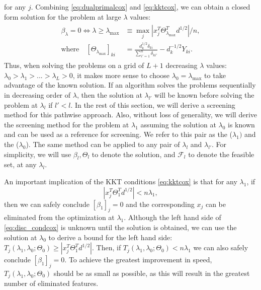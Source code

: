 for any $j$. Combining \eqref{eq:dualprimalcox} and \eqref{eq:kktcox}, we can obtain a closed form solution for the problem at large $\lambda$ values:
\begin{gather}
    \label{eq:lammaxcox}
    \begin{aligned}
        \beta_\lambda=0\iff \lambda \geq \lambda_{\max}&\equiv \max_j \left|x_j^T\Theta^T_{\lambda_{\max}}d^{1/2}\right|/n,\\
        \textrm{where}\quad[\Theta_{\lambda_{\max}}]_{ki}&=\frac{d_k^{1/2}\delta_{ki}}{\sum_{i'=1}^n\delta_{ki'}}-d_k^{-1/2}Y_{ki}.
    \end{aligned}
\end{gather}
Thus, when solving the problems on a grid of $L+1$ decreasing $\lambda$ values: $\lambda_0>\lambda_1>...>\lambda_L>0$, it makes more sense to choose $\lambda_0=\lambda_{\max}$ to take advantage of the known solution. If an algorithm solves the problems sequentially in decreasing order of $\lambda$, then the solution at $\lambda_{l'}$ will be known before solving the problem at $\lambda_l$ if $l'<l$. In the rest of this section, we will derive a screening method for this pathwise approach. Also, without loss of generality, we will derive the screening method for the problem at $\lambda_1$ assuming the solution at $\lambda_0$ is known and can be used as a reference for screening. We refer to this pair as the  ($\lambda_1)$ and the  ($\lambda_0$). The same method can be applied to any pair of $\lambda_{l}$ and $\lambda_{l'}$. For simplicity, we will use $\beta_l,\Theta_l$ to denote the solution, and $\mathcal{F}_l$ to denote the feasible set, at any $\lambda_l$.

An important implication of the KKT conditions \eqref{eq:kktcox} is that for any $\lambda_1$, if 
\begin{equation}
    \label{eq:disc_condcox}
    |x_j^T\Theta_{1}^Td^{1/2}|<n\lambda_1,
\end{equation}
then we can safely conclude $[\beta_1]_{j}=0$ and the corresponding $x_j$ can be eliminated from the optimization at $\lambda_1$. Although the left hand side of \eqref{eq:disc_condcox} is unknown until the solution is obtained, we can use the solution at $\lambda_{0}$ to derive a bound for the left hand side: $T_j(\lambda_{1},\lambda_{0};\Theta_{0})\geq |x_j^T\Theta_{1}^Td^{1/2}|$. Then, if $T_j(\lambda_{1},\lambda_{0};\Theta_{0})<n\lambda_1$ we can also safely conclude $[\beta_1]_{j}=0$. To achieve the greatest improvement in speed, $T_j(\lambda_{1},\lambda_{0};\Theta_{0})$ should be as small as possible, as this will result in the greatest number of eliminated features.

